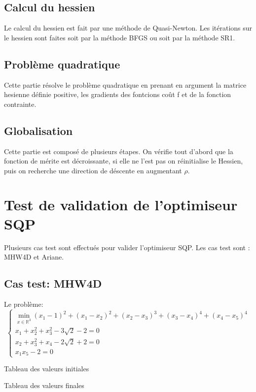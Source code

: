 \documentclass[a4paper,20pt]{article}
\begin{document}
\subsection{Calcul du hessien}
Le calcul du hessien est fait par une m\'ethode de Quasi-Newton. Les
 it\'erations sur le hessien sont faites soit par la méthode BFGS ou soit par la
 méthode SR1.

\subsection{Probl\`eme quadratique}
Cette partie r\'esolve le probl\`eme quadratique en prenant en argument la
 matrice hesienne d\'efinie positive, les gradients des fontcions co\^ut f et de
 la fonction contrainte.

\subsection{Globalisation}
Cette partie est compos\'e de plusieurs \'etapes. On v\'erifie tout d'abord que
 la fonction de m\'erite est d\'ecroissante, si elle ne l'est pas on
 r\'einitialise le Hessien, puis on recherche une direction de d\'escente en
 augmentant $\rho$.

\section{Test de validation de l'optimiseur SQP}
Plusieurs cas test sont effectu\'es pour valider l'optimiseur SQP. Les cas test
 sont : MHW4D et Ariane.


\subsection {Cas test: MHW4D}
Le probl\`eme:
$$
\begin{cases}
\min\limits_{x\in\mathbb{R}^3}{(x_1-1)^2+(x_1-x_2)^2+(x_2-x_3)^3+(x_3-x_4)^4
+(x_4-x_5)^4} \\
x_1+x_2^2+x_3^2-3\sqrt{2}-2=0 \\
x_2+x_3^2+x_4-2\sqrt{2}+2=0 \\
x_1x_5-2=0
\end{cases}
$$

Tableau des valeurs initiales

Tableau des valeurs finales
\end{document}
